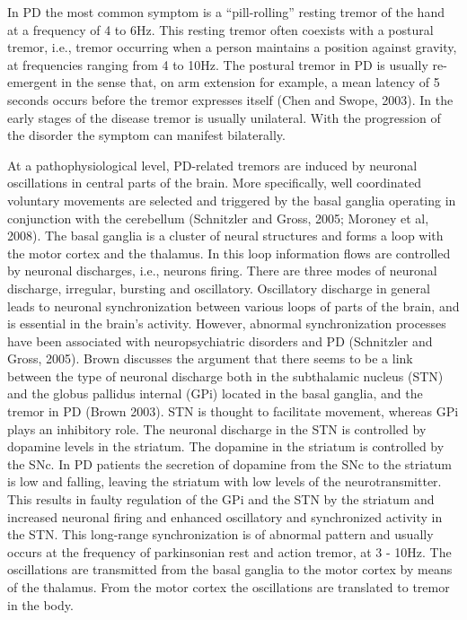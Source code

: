 
In \gls{PD} the most common symptom is a ``pill-rolling'' resting tremor of the hand at a frequency of 4 to 6Hz. This resting tremor often coexists with a postural tremor, i.e., tremor occurring when a person maintains a position against gravity, at frequencies ranging from 4 to 10Hz. The postural tremor in \gls{PD} is usually re-emergent in the sense that, on arm extension for example, a mean latency of 5 seconds occurs before the tremor expresses itself (Chen and Swope, 2003). In the early stages of the disease tremor is usually unilateral. With the progression of the disorder the symptom can manifest bilaterally.

At a pathophysiological level, \gls{PD}-related tremors are induced by neuronal oscillations in central parts of the brain. More specifically, well coordinated voluntary movements are selected and triggered by the basal ganglia operating in conjunction with the cerebellum (Schnitzler and Gross, 2005; Moroney et al, 2008). The basal ganglia is a cluster of neural structures and forms a loop with the motor cortex and the thalamus. In this loop information flows are controlled by neuronal discharges, i.e., neurons firing. There are three modes of neuronal discharge, irregular, bursting and oscillatory. Oscillatory discharge in general leads to neuronal synchronization between various loops of parts of the brain, and is essential in the brain's activity. However, abnormal synchronization processes have been associated with neuropsychiatric disorders and \gls{PD} (Schnitzler and Gross, 2005). Brown discusses the argument that there seems to be a link between the type of neuronal discharge both in the subthalamic nucleus (STN) and the globus pallidus internal (GPi) located in the basal ganglia, and the tremor in \gls{PD} (Brown 2003). STN is thought to facilitate movement, whereas GPi plays an inhibitory role. The neuronal discharge in the STN is controlled by dopamine levels in the striatum. The dopamine in the striatum is controlled by the SNc. In \gls{PD} patients the secretion of dopamine from the SNc to the striatum is low and falling, leaving the striatum with low levels of the neurotransmitter. This results in faulty regulation of the GPi and the STN by the striatum and increased neuronal firing and enhanced oscillatory and synchronized activity in the STN. This long-range synchronization is of abnormal pattern and usually occurs at the frequency of parkinsonian rest and action tremor, at 3 - 10Hz. The oscillations are transmitted from the basal ganglia to the motor cortex by means of the thalamus. From the motor cortex the oscillations are translated to tremor in the body.
 
